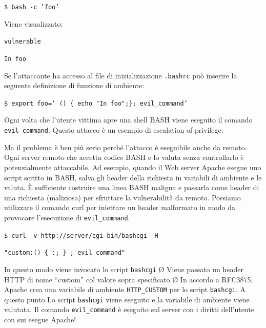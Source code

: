 \texttt{\$ bash -c 'foo'}

\vspace{5mm}

Viene visualizzato:

\vspace{5mm}

\texttt{vulnerable}

\texttt{In foo}

\vspace{5mm}

Se l’attaccante ha accesso al file di inizializzazione \texttt{.bashrc}
può inserire la seguente definizione di funzione di ambiente:

\vspace{5mm}

\texttt{\$ export foo=' () \{ echo "In foo";\}; evil\_command'}

\vspace{5mm}

Ogni volta che l’utente vittima apre una shell BASH viene
eseguito il comando \texttt{evil\_command}. Questo attacco è un esempio di escalation of privilege.

Ma il problema è ben più serio perché l’attacco è
eseguibile anche da remoto.
Ogni server remoto che accetta codice BASH e lo valuta
senza controllarlo è potenzialmente attaccabile. Ad esempio, quando il Web server Apache esegue uno script
scritto in BASH, salva gli header della richiesta in variabili di
ambiente e le valuta. È sufficiente costruire una linea BASH maligna e passarla
come header di una richiesta (maliziosa) per sfruttare la
vulnerabilità da remoto. Possiamo utilizzare il comando curl per iniettare un
header malformato in modo da provocare l’esecuzione
di \texttt{evil\_command}.

\vspace{5mm}

\texttt{\$ curl -v http://server/cgi-bin/bashcgi -H}

\texttt{"custom:() \{ :; \} ; evil\_command"}

\vspace{5mm}

In questo modo viene invocato lo script \texttt{bashcgi}
Ø Viene passato un header HTTP di nome “custom” col
valore sopra specificato
Ø In accordo a RFC3875, Apache crea una variabile di
ambiente \texttt{HTTP\_CUSTOM} per lo script \texttt{bashcgi}. A questo punto Lo script \texttt{bashcgi} viene eseguito e la variabile di
ambiente viene valutata. Il comando \texttt{evil\_command} è eseguito sul server con i
diritti dell’utente con sui esegue Apache! 

